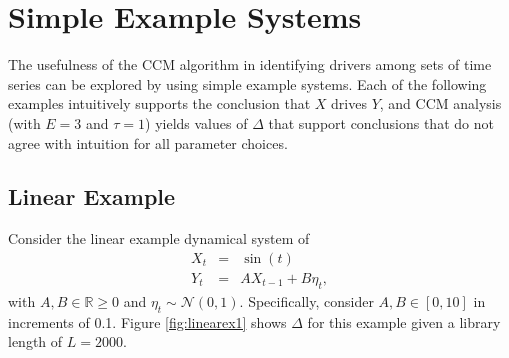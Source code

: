 \documentclass[twocolumn,aps,pre,groupedaddress]{revtex4-1}
\begin{document}
\section{Simple Example Systems}
The usefulness of the CCM algorithm in identifying drivers among sets of time series can be explored by using simple example systems.  Each of the following examples intuitively supports the conclusion that $X$ drives $Y$, and CCM analysis (with $E=3$ and $\tau=1$) yields values of $\Delta$ that support conclusions that do not agree with intuition for all parameter choices.

\subsection{Linear Example}
Consider the linear example dynamical system of
\begin{eqnarray}
\label{eq:linearex}
X_t &=& \sin(t)\\
Y_t &=& AX_{t-1}+B\eta_t,
\end{eqnarray}
with $A,B\in\mathbb{R}\ge 0$ and $\eta_t\sim\mathcal{N}\left(0,1\right)$.  Specifically, consider $A,B\in[0,10]$ in increments of 0.1.  Figure \ref{fig:linearex1} shows $\Delta$ for this example given a library length of $L=2000$.
\end{document}

